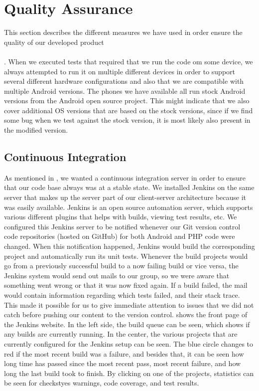 
\chapter{Quality Assurance}
\label{cha:quality_assurance}

This section describes the different measures we have used in order ensure the quality of our developed product 
\\\\
. 
When we executed tests that required that we run the code om some device, we always attempted to run it on multiple different devices in order to support several different hardware configurations and also that we are compatible with multiple Android versions. The phones we have available all run stock Android versions from the Android open source project. This might indicate that we also cover additional OS versions that are based on the stock versions, since if we find some bug when we test against the stock version, it is most likely also present in the modified version. 

\section{Continuous Integration}
\label{sec:continuous_integration}
As mentioned in , we wanted a continuous integration server in order to ensure that our code base always was at a stable state. We installed Jenkins on the same server that makes up the server part of our client-server architecture because it was easily available. Jenkins is an open source automation server, which supports various different plugins that helps with builds, viewing test results, etc. We configured this Jenkins server to be notified whenever our Git version control code repositories (hosted on GitHub) for both Android and PHP code were changed. When this notification happened, Jenkins would build the corresponding project and automatically run its unit tests. Whenever the build projects would go from a previously successful build to a now failing build or vice versa, the Jenkins system would send out mails to our group, so we were aware that something went wrong or that it was now fixed again. If a build failed, the mail would contain information regarding which tests failed, and their stack trace. This made it possible for us to give immediate attention to issues that we did not catch before pushing our content to the version control.  shows the front page of the Jenkins website. In the left side, the build queue can be seen, which shows if any builds are currently running. In the center, the various projects that are currently configured for the Jenkins setup can be seen. The blue circle changes to red if the most recent build was a failure, and besides that, it can be seen how long time has passed since the most recent pass, most recent failure, and how long the last build took to finish. By clicking on one of the projects, statistics can be seen for checkstyes warnings, code coverage, and test results. 


